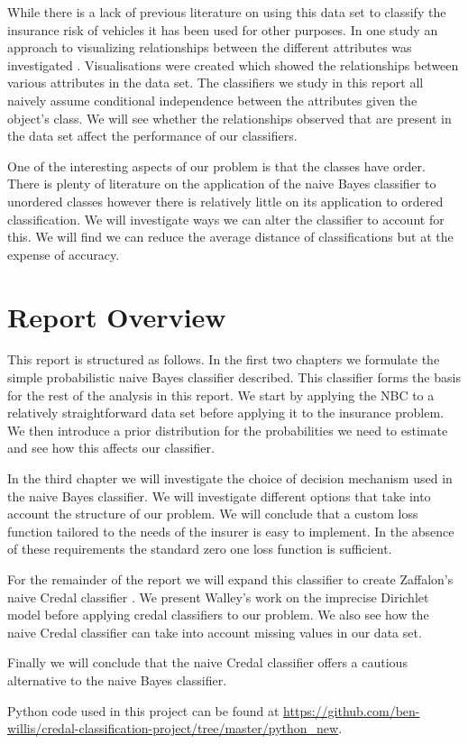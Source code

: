 While there is a lack of previous literature on using this data set to classify the insurance risk of vehicles it has been used for other purposes.
In one study an approach to visualizing relationships between the different attributes was investigated \cite{Rosario04}.
Visualisations were created which showed the relationships between various attributes in the data set.
The classifiers we study in this report all naively assume conditional independence between the attributes given the object's class.
We will see whether the relationships observed that are present in the data set affect the performance of our classifiers.

One of the interesting aspects of our problem is that the classes have order.
There is plenty of literature on the application of the naive Bayes classifier to unordered classes however there is relatively little on its application to ordered classification.
We will investigate ways we can alter the classifier to account for this.
We will find we can reduce the average distance of classifications but at the expense of accuracy.

\section{Report Overview}
This report is structured as follows. In the first two chapters we formulate the simple probabilistic naive Bayes classifier described.
This classifier forms the basis for the rest of the analysis in this report.
We start by applying the NBC to a relatively straightforward data set before applying it to the insurance problem.
We then introduce a prior distribution for the probabilities we need to estimate and see how this affects our classifier.

In the third chapter we will investigate the choice of decision mechanism used in the naive Bayes classifier.
We will investigate different options that take into account the structure of our problem.
We will conclude that a custom loss function tailored to the needs of the insurer is easy to implement.
In the absence of these requirements the standard zero one loss function is sufficient.

For the remainder of the report we will expand this classifier to create Zaffalon's  naive Credal classifier \cite{Zaffalon01}.
We present Walley's work \cite{Walley96} on the imprecise Dirichlet model before applying credal classifiers to our problem.
We also see how the naive Credal classifier can take into account missing values in our data set.

Finally we will conclude that the naive Credal classifier offers a cautious alternative to the naive Bayes classifier.

Python code used in this project can be found at \url{https://github.com/ben-willis/credal-classification-project/tree/master/python_new}.